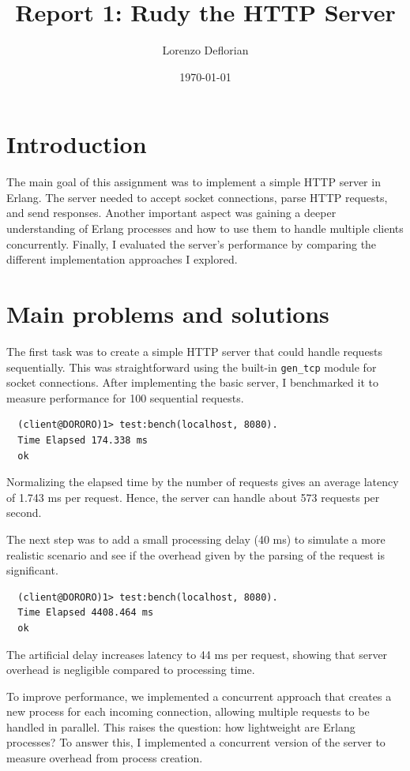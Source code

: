 \documentclass[a4paper, 11pt]{article}
\title{Report 1: Rudy the HTTP Server}
\author{Lorenzo Deflorian}
\date{\today{}}
\begin{document}
\maketitle

\section{Introduction}

The main goal of this assignment was to implement a simple HTTP server in Erlang.
The server needed to accept socket connections, parse HTTP requests, and send responses.
Another important aspect was gaining a deeper understanding of Erlang processes and how to use them to handle multiple clients concurrently.
Finally, I evaluated the server's performance by comparing the different implementation approaches I explored.


\section{Main problems and solutions}

The first task was to create a simple HTTP server that could handle requests sequentially.
This was straightforward using the built-in \texttt{gen\_tcp} module for socket connections. After implementing the basic server, I benchmarked it to measure performance for 100 sequential requests.

\begin{verbatim}
  (client@DORORO)1> test:bench(localhost, 8080).
  Time Elapsed 174.338 ms
  ok
\end{verbatim}

Normalizing the elapsed time by the number of requests gives an average latency of 1.743 ms per request. Hence, the server can handle about 573 requests per second.

The next step was to add a small processing delay (40 ms) to simulate a more realistic scenario and see if the overhead given by the parsing of the request is significant.

\begin{verbatim}
  (client@DORORO)1> test:bench(localhost, 8080).
  Time Elapsed 4408.464 ms
  ok
\end{verbatim}

The artificial delay increases latency to 44 ms per request, showing that server overhead is negligible compared to processing time.

To improve performance, we implemented a concurrent approach that creates a new process for each incoming connection, allowing multiple requests to be handled in parallel. This raises the question: how lightweight are Erlang processes? To answer this, I implemented a concurrent version of the server to measure overhead from process creation.
\end{document}
